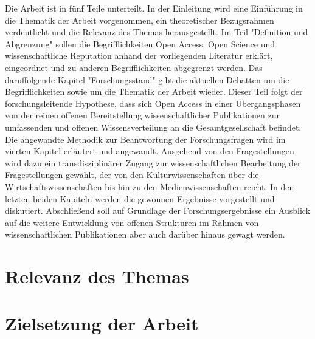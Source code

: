 Die Arbeit ist in fünf Teile unterteilt. In der Einleitung wird eine Einführung in die Thematik der Arbeit vorgenommen, ein theoretischer Bezugsrahmen verdeutlicht und die Relevanz des Themas herausgestellt. Im Teil "Definition und Abgrenzung" sollen die Begrifflichkeiten Open Access, Open Science und wissenschaftliche Reputation anhand der vorliegenden Literatur erklärt, eingeordnet und zu anderen Begrifflichkeiten abgegrenzt werden. Das daruffolgende Kapitel "Forschungsstand" gibt die aktuellen Debatten um die Begrifflichkeiten sowie um die Thematik der Arbeit wieder. Dieser Teil folgt der forschungsleitende Hypothese, dass sich Open Access in einer Übergangsphasen von der reinen offenen Bereitstellung wissenschaftlicher Publikationen zur umfassenden und offenen Wissensverteilung an die Gesamtgesellschaft befindet. Die angewandte Methodik zur Beantwortung der Forschungsfragen wird im vierten Kapitel erläutert und angewandt. Ausgehend von den Fragestellungen wird dazu ein transdisziplinärer Zugang zur wissenschaftlichen Bearbeitung der Fragestellungen gewählt, der von den Kulturwissenschaften über die Wirtschaftswissenschaften bis hin zu den Medienwissenschaften reicht. In den letzten beiden Kapiteln werden die gewonnen Ergebnisse vorgestellt und diskutiert. Abschließend soll auf Grundlage der Forschungsergebnisse ein Ausblick auf die weitere Entwicklung von offenen Strukturen im Rahmen von wissenschaftlichen Publikationen aber auch darüber hinaus gewagt werden.


\section{Relevanz des Themas} 

\section{Zielsetzung der Arbeit} 

